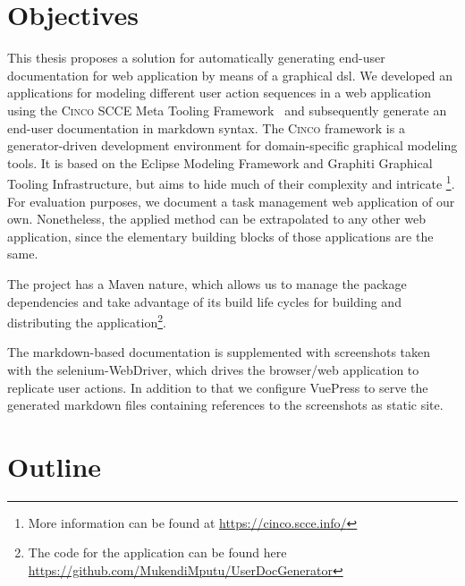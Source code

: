 \section{Objectives}\label{sec:objectives}

This thesis proposes a solution for automatically generating end-user documentation for web application by means of a graphical \acrfull{dsl}. We developed an applications for modeling different user action sequences in a web application using the \textsc{Cinco} SCCE Meta Tooling Framework~\cite{Cinco} and subsequently generate an end-user documentation in markdown syntax. The \textsc{Cinco} framework is a generator-driven development environment for domain-specific graphical modeling tools. It is based on the Eclipse Modeling Framework and Graphiti Graphical Tooling Infrastructure, but aims to hide much of their complexity and intricate \footnote{More information can be found at \url{https://cinco.scce.info/}}. For evaluation purposes, we document a task management web application of our own. Nonetheless, the applied method can be extrapolated to any other web application, since the elementary building blocks of those applications are the same.

The project has a Maven nature, which allows us to manage the package dependencies and take advantage of its build life cycles for building and distributing the application\footnote{The code for the application can be found here \url{https://github.com/MukendiMputu/UserDocGenerator}}.

The markdown-based documentation is supplemented with screenshots taken with the \gls{selenium}-WebDriver, which drives the browser/web application to replicate user actions. In addition to that we configure \gls{VuePress} to serve the generated markdown files containing references to the screenshots as static site.

\section{Outline}\label{sec:outline}


